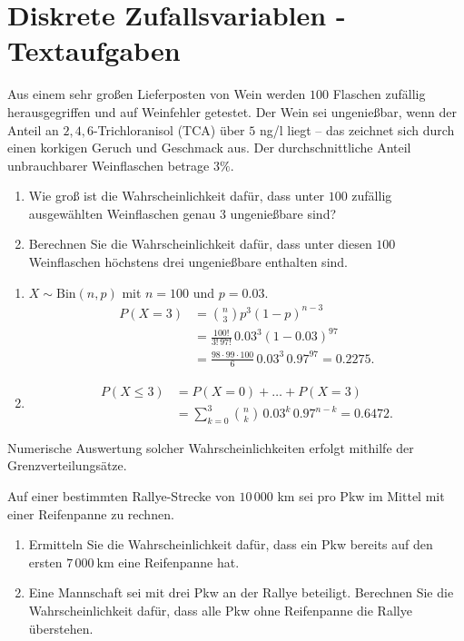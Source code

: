 \section{Diskrete Zufallsvariablen - Textaufgaben} 

 Aus einem sehr großen Lieferposten
von Wein werden $100$ Flaschen zufällig herausgegriffen und auf Weinfehler
getestet.  Der Wein sei ungenießbar, wenn der Anteil an $2,4,6$-Trichloranisol
(TCA) über $5$ ng/l liegt -- das zeichnet sich durch einen korkigen Geruch und
Geschmack aus.  Der durchschnittliche Anteil unbrauchbarer Weinflaschen betrage
$3\%$. 
\begin{enumerate}
    \item Wie groß ist die Wahrscheinlichkeit dafür, dass unter $100$ zufällig 
        ausgewählten Weinflaschen genau $3$ ungenießbare sind? 
    \item Berechnen Sie die Wahrscheinlichkeit dafür, dass unter diesen $100$
        Weinflaschen höchstens drei ungenießbare enthalten sind. 
\end{enumerate}

\solution 
\begin{enumerate}
    \item $X\sim \text{Bin}(n, p)$ mit $n=100$ und $p=0.03$. 
        \begin{align*}
            P(X=3) &= \binom{n}{3} p^{3}(1-p)^{n-3} \\
            &= \frac{100!}{3!\, 97!}\, {0.03}^{3}\left( 1-0.03 \right)^{97} \\
            &= \frac{98\cdot 99\cdot 100}{ 6}\, {0.03}^{3}\, {0.97}^{97} = 0.2275.
        \end{align*}
    \item \begin{align*}
            P(X\leq 3) &= P(X=0)+\dots+P(X=3) \\
            &= \sum_{k=0}^{3} \binom{n}{k}\, {0.03}^{k}\, {0.97}^{n-k} = 0.6472.
        \end{align*}
\end{enumerate}
Numerische Auswertung solcher Wahrscheinlichkeiten erfolgt mithilfe  der Grenzverteilungsätze.

 Auf einer bestimmten Rallye-Strecke von $10\, 000$ km
sei pro Pkw im Mittel mit einer Reifenpanne zu rechnen. 
\begin{enumerate}
    \item Ermitteln Sie die Wahrscheinlichkeit dafür, dass ein Pkw bereits auf
        den ersten $7\, 000~\text{km}$ eine Reifenpanne hat. 
    \item Eine Mannschaft sei mit drei Pkw an der Rallye beteiligt. Berechnen
        Sie die Wahrscheinlichkeit dafür, dass alle Pkw ohne Reifenpanne die
        Rallye überstehen. 
\end{enumerate}

